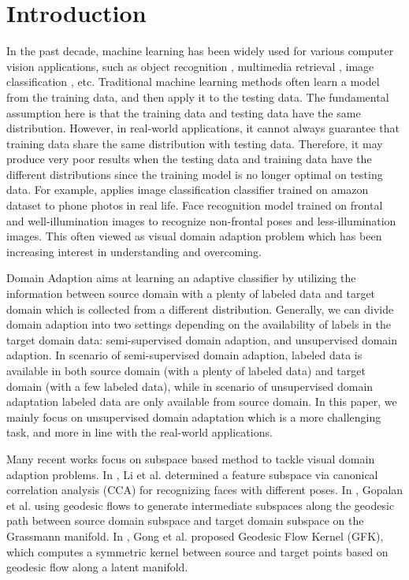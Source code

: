 \documentclass{article}
\begin{document}
\section{Introduction}
\label{sec:intro}


In the past decade, machine learning has been widely used for various computer vision applications, such as object recognition \cite{zhang2011sparse}, multimedia retrieval  \cite{zheng2015fast,zheng2014coupled,kuang2015retrieval}, image classification \cite{sanchez2013image}, etc. Traditional machine learning methods often learn a model from the training data, and then apply it to the testing data. The fundamental assumption here is that the training data and testing data have the same distribution. However, in real-world applications, it cannot always guarantee that training data share the same distribution with testing data. Therefore, it may produce very poor results when the testing data and training data have the different distributions since the training model is no longer optimal on testing data. For example, applies image classification classifier trained on amazon dataset to phone photos in real life. Face recognition model trained on frontal and well-illumination images to recognize non-frontal poses and less-illumination images. This often viewed as visual domain adaption problem which has been increasing interest in understanding and overcoming.

  Domain Adaption aims at learning an adaptive classifier by utilizing the information between source domain with a plenty of labeled data and target domain which is collected from a different distribution. Generally, we can divide domain adaption into two settings depending on the availability of labels in the target domain data: semi-supervised domain adaption, and unsupervised domain adaption. 
  In scenario of semi-supervised domain adaption, labeled data is available in both source domain (with a plenty of labeled data) and target domain (with a few labeled data), while in scenario of unsupervised domain adaptation labeled data are only available from source domain.  In this paper, we mainly focus on unsupervised domain adaptation which is a more challenging task, and more in line with the real-world applications.

Many recent works \cite{gopalan2011domain,gong2012geodesic,li2009maximizing} focus on subspace based method to tackle visual domain adaption problems. In \cite{li2009maximizing}, Li et al. determined a feature subspace via canonical correlation analysis (CCA) \cite{hotelling1936relations} for recognizing faces with different poses. In \cite{gopalan2011domain}, Gopalan et al. using geodesic flows to generate intermediate subspaces along the geodesic path between source domain subspace and target domain subspace on the Grassmann manifold. In \cite{gong2012geodesic}, Gong et al. proposed Geodesic Flow Kernel (GFK), which computes a symmetric kernel between source and target points based on geodesic flow along a latent manifold. 
\end{document}
